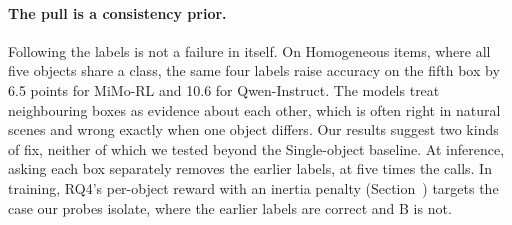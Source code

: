 \paragraph{The pull is a consistency prior.} Following the labels is not a failure in itself. On
Homogeneous items, where all five objects share a class, the same four labels raise accuracy on the
fifth box by 6.5 points for MiMo-RL and 10.6 for Qwen-Instruct. The models treat neighbouring boxes
as evidence about each other, which is often right in natural scenes and wrong exactly when one
object differs. Our results suggest two kinds of fix, neither of which we tested beyond the
Single-object baseline. At inference, asking each box separately removes the earlier labels, at five
times the calls. In training, RQ4's per-object reward with an inertia penalty (Section~\tbd) targets
the case our probes isolate, where the earlier labels are correct and B is not.
